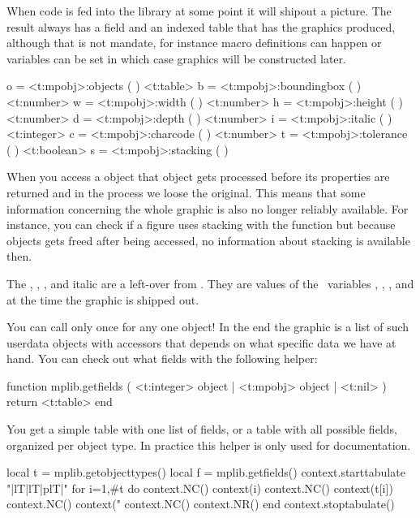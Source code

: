 When code is fed into the library at some point it will shipout a picture. The
result always has a  field and an indexed  table that
has the graphics produced, although that is not mandate, for instance macro
definitions can happen or variables can be set in which case graphics will be
constructed later.

 o = <t:mpobj>:objects     ( )
<t:table>    b = <t:mpobj>:boundingbox ( )
<t:number>   w = <t:mpobj>:width       ( )
<t:number>   h = <t:mpobj>:height      ( )
<t:number>   d = <t:mpobj>:depth       ( )
<t:number>   i = <t:mpobj>:italic      ( )
<t:integer>  c = <t:mpobj>:charcode    ( )
<t:number>   t = <t:mpobj>:tolerance   ( )
<t:boolean>  s = <t:mpobj>:stacking    ( )
\stoptyping

When you access a object that object gets processed before its properties are
returned and in the process we loose the original. This means that some
information concerning the whole graphic is also no longer reliably available.
For instance, you can check if a figure uses stacking with the 
function but because objects gets freed after being accessed, no information
about stacking is available then.

The , , ,  and \type
{italic} are a left-over from \METAFONT. They are values of the \METAPOST\
variables , , \typ
[option=MP] {fontcharht}, \typ [option=MP] {fontchardp} and \typ [option=MP]
{fontcharit} at the time the graphic is shipped out.

You can call  only once for any one  object! In
the end the graphic is a list of such userdata objects with accessors that
depends on what specific data we have at hand. You can check out what fields with
the following helper:

\starttyping[option=LUA]
function mplib.getfields ( <t:integer> object | <t:mpobj> object | <t:nil> )
    return <t:table>
end
\stoptyping

You get a simple table with one list of fields, or a table with all possible
fields, organized per object type. In practice this helper is only used for
documentation.

\startluacode
    local t = mplib.getobjecttypes()
    local f = mplib.getfields()
    context.starttabulate { "|lT|lT|plT|" }
    for i=1,#t do
        context.NC() context(i)
        context.NC() context(t[i])
        context.NC() context("%
        context.NC() context.NR()
    end
    context.stoptabulate()
\stopluacode

